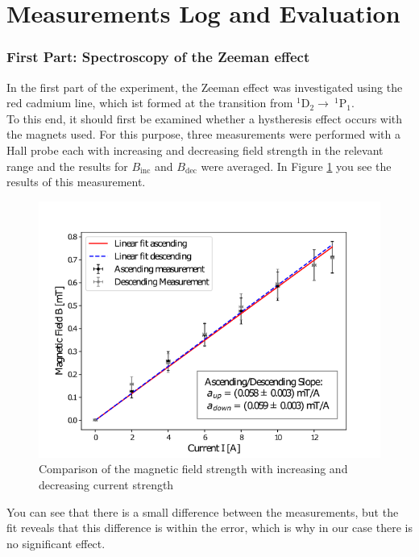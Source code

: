 \section{Measurements Log and Evaluation}
\subsubsection{First Part: Spectroscopy of the Zeeman effect}
In the first part of the experiment, the Zeeman effect was investigated using the red cadmium line, which ist formed at the transition from $^1\text{D}_2\rightarrow ~^1\text{P}_1$.\\

To this end, it should first be examined whether a hystheresis effect occurs with the magnets used.
For this purpose, three measurements were performed with a Hall probe each with increasing and decreasing field strength in the relevant range and the results for $B_\text{inc}$ and $B_\text{dec}$ were averaged.
In Figure \ref{fig:hystheresis} you see the results of this measurement.
\begin{figure}[ht]
\centering
\includegraphics[scale=.55]{images//hystheresis.png}
\caption{Comparison of the magnetic field strength with increasing and decreasing current strength}
\label{fig:hystheresis}
\end{figure}
You can see that there is a small difference between the measurements, but the fit reveals that this difference is within the error, which is why in our case there is no significant effect.\\

